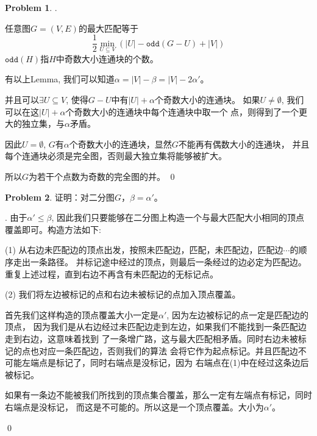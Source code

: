 \documentclass[UTF8]{ctexart}
\newenvironment{sol}
  {\par\vspace{3mm}\noindent{\it Solution}.}
  {\qed \\ \medskip}
\theoremstyle{definition}
\newtheorem{problem}{Problem}
\begin{document}
\begin{problem}
\begin{sol}
    \begin{lemma}
        任意图$G=(V,E)$的最大匹配等于
        $$
        \frac 1 2 \min_{U \subseteq V} (|U| - \mathtt{odd}(G - U) + |V|)
        $$
        $\mathtt{odd}(H)$指$H$中奇数大小连通块的个数。
    \end{lemma}

    有以上Lemma, 我们可以知道$\alpha = |V| - \beta = |V| - 2 \alpha'$。
    
    并且可以$\exists U \subseteq V$, 使得$G-U$中有$|U|+\alpha$个奇数大小的连通块。
    如果$U \not= \emptyset$, 我们可以在这$|U|+\alpha$个奇数大小的连通块中每个连通块中取一个
    点，则得到了一个更大的独立集，与$\alpha$矛盾。

    因此$U = \emptyset$, $G$有$\alpha$个奇数大小的连通块，显然$G$不能再有偶数大小的连通块，
    并且每个连通块必须是完全图，否则最大独立集将能够被扩大。
    
    所以$G$为若干个点数为奇数的完全图的并。
\end{sol}
\end{problem}

\begin{problem}
证明：对二分图$G$，$\beta = \alpha' $。
\begin{sol}
    由于$\alpha' \leq \beta$, 因此我们只要能够在二分图上构造一个与最大匹配大小相同的顶点
    覆盖即可。构造方法如下:

    (1) 从右边未匹配边的顶点出发，按照未匹配边，匹配，未匹配边，匹配边$\cdots$的顺序走出一条路径。
    并标记途中经过的顶点，则最后一条经过的边必定为匹配边。重复上述过程，直到右边不再含有未匹配边的无标记点。

    (2) 我们将左边被标记的点和右边未被标记的点加入顶点覆盖。

    首先我们这样构造的顶点覆盖大小一定是$\alpha'$, 因为左边被标记的点一定是匹配边的顶点，
    因为我们是从右边经过未匹配边走到左边，如果我们不能找到一条匹配边走到右边，这意味着找到
    了一条增广路，这与最大匹配相矛盾。同时右边未被标记的点也对应一条匹配边，否则我们的算法
    会将它作为起点标记。并且匹配边不可能左端点是标记了，同时右端点是没标记，因为
    右端点在(1)中在经过这条边后被标记。

    如果有一条边不能被我们所找到的顶点集合覆盖，那么一定有左端点有标记，同时右端点是没标记，
    而这是不可能的。所以这是一个顶点覆盖。大小为$\alpha'$。

\end{sol}
\end{problem}
\end{document}
